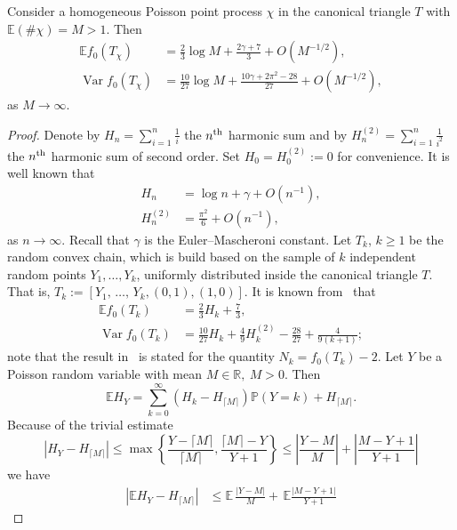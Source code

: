 \documentclass[AHL,Unicode,longabstracts,published]{cedram}
\newcommand{\var}{\operatorname{Var}}
\newcommand{\bbR}{\mathbb{R}}
\newcommand{\bbE}{\mathbb{E}}
\newcommand{\bbP}{\mathbb{P}}
\begin{document}
\begin{lemm}\label{lm:estimatesPoissonChain}
Consider a homogeneous Poisson point process $\chi$ in the canonical triangle $T$ with $\bbE(\# \chi)=M>1$. Then
\begin{align}
\bbE f_0(T_{\chi})&=\frac{2}{3}\log M + \frac {2\gamma +7}3 +O\left(M^{-1/2}\right),\label{eq:poissonExp}
\\
\var f_0(T_{\chi})&= \frac {10}{27} \log M + \frac{10 \gamma + 2\pi^2 - 28 }{27} + O\left(M^{-1/2}\right),\label{eq:poissonVar}
\end{align}
as $M\to\infty$.
\end{lemm}


\begin{proof}
Denote by $H_n = \sum_{i=1}^{n} \frac 1i$ the $n^{\rm th}$ harmonic sum and by $H^{(2)}_n = \sum_{i=1}^{n} \frac 1{i^2}$ the $n^{\rm th}$ harmonic sum of second order. Set $H_0= H^{(2)}_0:=0$ for convenience. It is well known that
\begin{align}
H_n &= \log n +\gamma + O(n^{-1}) \label{eq:HarmNum1}
,\\
H^{(2)}_n &= \frac{\pi^2}6+O(n^{-1}) \label{eq:HarmNum2}
,
\end{align}
as $n \to \infty$. Recall that $\gamma$ is the Euler--Mascheroni constant. Let $T_k$, $k\ge 1$ be the random convex chain, which is build based on the sample of $k$ independent random points $Y_1,\ldots, Y_k$, uniformly distributed inside the canonical triangle $T$. That is, $T_k:=[Y_1,\,\ldots,\,Y_k,(0,1),(1,0)]$. It is known from~\cite[Corollary~1 and Corollary~2]{Buch12} that
\begin{align}\label{eq:expUnif}
\bbE f_0(T_k)&= \frac{2}{3} H_k + \frac 73,
\\\label{eq:varUnif}
\var f_0(T_k)&=\frac{10}{27} H_k + \frac{4}{9} H^{(2)}_k - \frac{28}{27 } + \frac{4}{9(k+1)} ;
\end{align}
note that the result in~\cite{Buch12} is stated for the quantity $N_k= f_0(T_k)-2$. Let $Y$ be a Poisson random variable with mean $M \in \bbR,\ M >0$. Then
\[
\bbE H_Y =
\sum_{k=0}^\infty \left(H_k-H_{\lceil M \rceil}\right) \bbP(Y=k) + H_{\lceil M \rceil}.
\]
Because of the trivial estimate
\[
\left|H_Y-H_{\lceil M \rceil}\right| \leq \max \left\{ \frac {Y-\lceil M \rceil}{\lceil M \rceil}, \frac {\lceil M \rceil-Y}{Y+1} \right\}
\leq
\left|\frac {Y-M}M \right| + \left|\frac {M-Y+1}{Y+1} \right|
\]
we have
\begin{align*}
\left|\bbE H_Y - H_{\lceil M \rceil} \right| & \leq
\bbE \, \frac {|Y-M|}M + \, \bbE \frac {|M-Y+1|}{Y+1}

\end{align*}
\end{proof}
\end{document}
